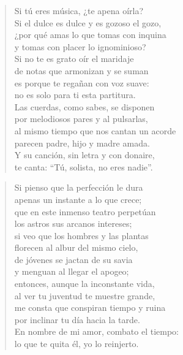 \documentclass[12pt]{article}
\begin{document}
\clearpage
{}
\begin{verse}

Si tú eres música, ¿te apena oírla?\\
Si el dulce es dulce y es gozoso el gozo,\\
¿por qué amas lo que tomas con inquina\\
y tomas con placer lo ignominioso?\\
Si no te es grato oír el maridaje\\
de notas que armonizan y se suman\\
es porque te regañan con voz suave:\\
no es solo para ti esta partitura.\\
Las cuerdas, como sabes, se disponen\\
por melodiosos pares y al pulsarlas,\\
al mismo tiempo que nos cantan un acorde\\
parecen padre, hijo y madre amada.\\
Y su canción, sin letra y con donaire,\\
te canta: ``Tú, solista, no eres nadie''.

\end{verse}

\clearpage
{}
\begin{verse}

Si pienso que la perfección le dura\\
apenas un instante a lo que crece;\\
que en este inmenso teatro perpetúan\\
los astros sus arcanos intereses;\\
si veo que los hombres y las plantas\\
florecen al albur del mismo cielo,\\
de jóvenes se jactan de su savia\\
y menguan al llegar el apogeo;\\
entonces, aunque la inconstante vida,\\
al ver tu juventud te muestre grande,\\
me consta que conspiran tiempo y ruina\\
por inclinar tu día hacia la tarde.\\
En nombre de mi amor, combato el tiempo:\\
lo que te quita él, yo lo reinjerto.

\end{verse}
\end{document}
